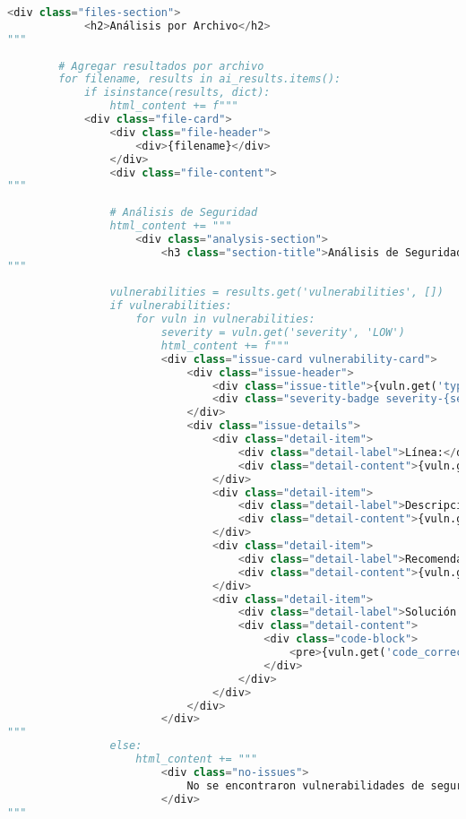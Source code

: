\begin{lstlisting}[language=python, caption={Contenido completo del script ai\_analyzer.py.}, label={lst:python_script}]
        <div class="files-section">
            <h2>Análisis por Archivo</h2>
"""
        
        # Agregar resultados por archivo
        for filename, results in ai_results.items():
            if isinstance(results, dict):
                html_content += f"""
            <div class="file-card">
                <div class="file-header">
                    <div>{filename}</div>
                </div>
                <div class="file-content">
"""
                
                # Análisis de Seguridad
                html_content += """
                    <div class="analysis-section">
                        <h3 class="section-title">Análisis de Seguridad</h3>
"""
                
                vulnerabilities = results.get('vulnerabilities', [])
                if vulnerabilities:
                    for vuln in vulnerabilities:
                        severity = vuln.get('severity', 'LOW')
                        html_content += f"""
                        <div class="issue-card vulnerability-card">
                            <div class="issue-header">
                                <div class="issue-title">{vuln.get('type', 'Unknown Vulnerability')}</div>
                                <div class="severity-badge severity-{severity.lower()}-bg">{severity}</div>
                            </div>
                            <div class="issue-details">
                                <div class="detail-item">
                                    <div class="detail-label">Línea:</div>
                                    <div class="detail-content">{vuln.get('line', 'N/A')}</div>
                                </div>
                                <div class="detail-item">
                                    <div class="detail-label">Descripción:</div>
                                    <div class="detail-content">{vuln.get('description', 'N/A')}</div>
                                </div>
                                <div class="detail-item">
                                    <div class="detail-label">Recomendación:</div>
                                    <div class="detail-content">{vuln.get('recommendation', 'N/A')}</div>
                                </div>
                                <div class="detail-item">
                                    <div class="detail-label">Solución:</div>
                                    <div class="detail-content">
                                        <div class="code-block">
                                            <pre>{vuln.get('code_correction_suggested', 'N/A')}</pre>
                                        </div>
                                    </div>
                                </div>
                            </div>
                        </div>
"""
                else:
                    html_content += """
                        <div class="no-issues">
                            No se encontraron vulnerabilidades de seguridad
                        </div>
"""
                

\end{lstlisting}
